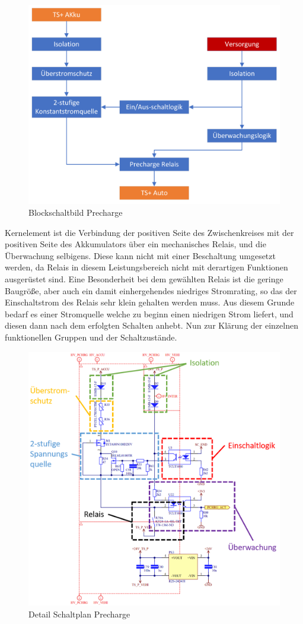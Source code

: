\begin{figure}
	\centering
	\includegraphics[width=0.6\linewidth]{"bilder/Precharge Blockschaltbild"}
	\caption{Blockschaltbild Precharge}
	\label{fig:precharge-blockschaltbild}
\end{figure}

Kernelement ist die Verbindung der positiven Seite des Zwischenkreises mit der positiven Seite des Akkumulators über ein mechanisches Relais, und die Überwachung selbigens. Diese kann nicht mit einer  Beschaltung umgesetzt werden, da Relais in diesem Leistungsbereich  nicht mit derartigen Funktionen ausgerüstet sind. Eine Besonderheit bei dem gewählten Relais ist die geringe Baugröße, aber auch ein damit einhergehendes niedriges Stromrating, so das der Einschaltstrom des Relais sehr klein gehalten werden muss. Aus diesem Grunde bedarf es einer Stromquelle welche zu beginn einen niedrigen Strom liefert, und diesen dann nach dem erfolgten Schalten anhebt. Nun zur Klärung der einzelnen funktionellen Gruppen und der Schaltzustände.

\begin{figure}
	\centering
	\includegraphics[width=1\linewidth]{"bilder/Precharge Blockschaltbild Detail"}
	\caption{Detail Schaltplan Precharge}
	\label{fig:precharge-blockschaltbild-detail}
\end{figure}

